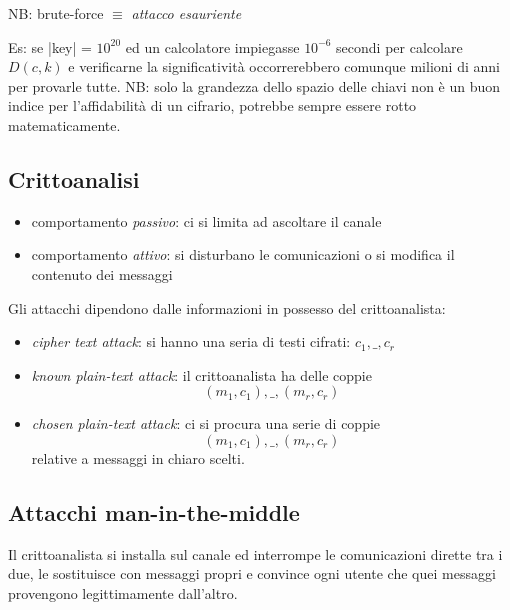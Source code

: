 NB: brute-force $\equiv$ \emph{attacco esauriente}

Es: se |key| = $10^{20}$ ed un calcolatore impiegasse $10^{-6}$ secondi per calcolare $D(c, k)$ e verificarne la significatività occorrerebbero comunque milioni di anni per provarle tutte.
NB: solo la grandezza dello spazio delle chiavi non è un buon indice per l'affidabilità di un cifrario, potrebbe sempre essere rotto matematicamente.

\subsection{Crittoanalisi}
\begin{itemize}
    \item comportamento \emph{passivo}: ci si limita ad ascoltare il canale
    \item comportamento \emph{attivo}: si disturbano le comunicazioni o si modifica il contenuto dei messaggi
\end{itemize}
Gli attacchi dipendono dalle informazioni in possesso del crittoanalista:
\begin{itemize}
    \item \emph{cipher text attack}: si hanno una seria di testi cifrati: $ c_{1}, \_ , c_{r} $
    \item \emph{known plain-text attack}: il crittoanalista ha delle coppie
    $$(m_{1}, c_{1}), \_ , (m_{r}, c_{r})$$
    \item \emph{chosen plain-text attack}: ci si procura una serie di coppie
    $$(m_{1}, c_{1}), \_ , (m_{r}, c_{r})$$
    relative a messaggi in chiaro scelti.
\end{itemize}

\subsection{Attacchi man-in-the-middle}
Il crittoanalista si installa sul canale ed interrompe le comunicazioni dirette tra i due, le sostituisce con messaggi propri e convince ogni utente che quei messaggi provengono legittimamente dall'altro.


